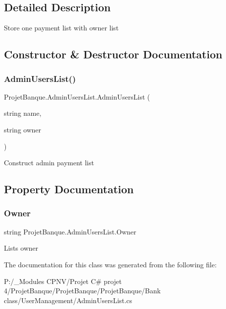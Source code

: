 \subsection{Detailed Description}
Store one payment list with owner list 



\subsection{Constructor \& Destructor Documentation}
\mbox{\label{class_projet_banque_1_1_admin_users_list_a91fe6ff510354c57d01bedc8f7b9b22c}} 
\subsubsection{\texorpdfstring{AdminUsersList()}{AdminUsersList()}}
{\footnotesize\ttfamily Projet\+Banque.\+Admin\+Users\+List.\+Admin\+Users\+List (\begin{DoxyParamCaption}\item[{string}]{name,  }\item[{string}]{owner }\end{DoxyParamCaption})}



Construct admin payment list 



\subsection{Property Documentation}
\mbox{\label{class_projet_banque_1_1_admin_users_list_a7e3c434e0b4a1e299d34bee42c8e3b1f}} 
\subsubsection{\texorpdfstring{Owner}{Owner}}
{\footnotesize\ttfamily string Projet\+Banque.\+Admin\+Users\+List.\+Owner\hspace{0.3cm}{\ttfamily [get]}}



List\textquotesingle{}s owner 



The documentation for this class was generated from the following file\+:\begin{DoxyCompactItemize}
\item 
P\+:/\+\_\+\+Modules C\+P\+N\+V/\+Projet C\# projet 4/\+Projet\+Banque/\+Projet\+Banque/\+Projet\+Banque/\+Bank class/\+User\+Management/Admin\+Users\+List.\+cs\end{DoxyCompactItemize}
